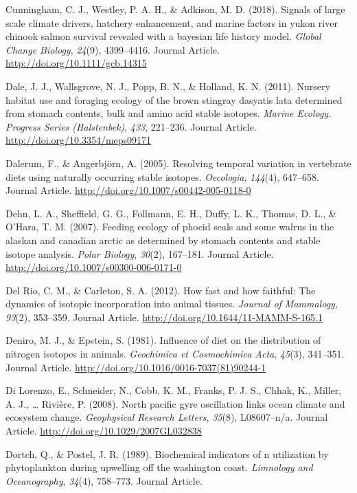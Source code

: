\documentclass [11pt, proquest] {uwthesis}[2015/03/03]
\begin{document}
\hypertarget{ref-Cunningham2018}{}
Cunningham, C. J., Westley, P. A. H., \& Adkison, M. D. (2018). Signals
of large scale climate drivers, hatchery enhancement, and marine factors
in yukon river chinook salmon survival revealed with a bayesian life
history model. \emph{Global Change Biology}, \emph{24}(9), 4399--4416.
Journal Article. \url{http://doi.org/10.1111/gcb.14315}

\hypertarget{ref-Dale2011}{}
Dale, J. J., Wallsgrove, N. J., Popp, B. N., \& Holland, K. N. (2011).
Nursery habitat use and foraging ecology of the brown stingray dasyatis
lata determined from stomach contents, bulk and amino acid stable
isotopes. \emph{Marine Ecology. Progress Series (Halstenbek)},
\emph{433}, 221--236. Journal Article.
\url{http://doi.org/10.3354/meps09171}

\hypertarget{ref-Dalerum2005}{}
Dalerum, F., \& Angerbjörn, A. (2005). Resolving temporal variation in
vertebrate diets using naturally occurring stable isotopes.
\emph{Oecologia}, \emph{144}(4), 647--658. Journal Article.
\url{http://doi.org/10.1007/s00442-005-0118-0}

\hypertarget{ref-Dehn2007}{}
Dehn, L. A., Sheffield, G. G., Follmann, E. H., Duffy, L. K., Thomas, D.
L., \& O'Hara, T. M. (2007). Feeding ecology of phocid seals and some
walrus in the alaskan and canadian arctic as determined by stomach
contents and stable isotope analysis. \emph{Polar Biology},
\emph{30}(2), 167--181. Journal Article.
\url{http://doi.org/10.1007/s00300-006-0171-0}

\hypertarget{ref-DelRio2012}{}
Del Rio, C. M., \& Carleton, S. A. (2012). How fast and how faithful:
The dynamics of isotopic incorporation into animal tissues.
\emph{Journal of Mammalogy}, \emph{93}(2), 353--359. Journal Article.
\url{http://doi.org/10.1644/11-MAMM-S-165.1}

\hypertarget{ref-Deniro1981}{}
Deniro, M. J., \& Epstein, S. (1981). Influence of diet on the
distribution of nitrogen isotopes in animals. \emph{Geochimica et
Cosmochimica Acta}, \emph{45}(3), 341--351. Journal Article.
\url{http://doi.org/10.1016/0016-7037(81)90244-1}

\hypertarget{ref-DiLorenzo2008}{}
Di Lorenzo, E., Schneider, N., Cobb, K. M., Franks, P. J. S., Chhak, K.,
Miller, A. J., \ldots{} Rivière, P. (2008). North pacific gyre
oscillation links ocean climate and ecosystem change. \emph{Geophysical
Research Letters}, \emph{35}(8), L08607--n/a. Journal Article.
\url{http://doi.org/10.1029/2007GL032838}

\hypertarget{ref-Dortch1989}{}
Dortch, Q., \& Postel, J. R. (1989). Biochemical indicators of n
utilization by phytoplankton during upwelling off the washington coast.
\emph{Limnology and Oceanography}, \emph{34}(4), 758--773. Journal
Article.
\end{document}
